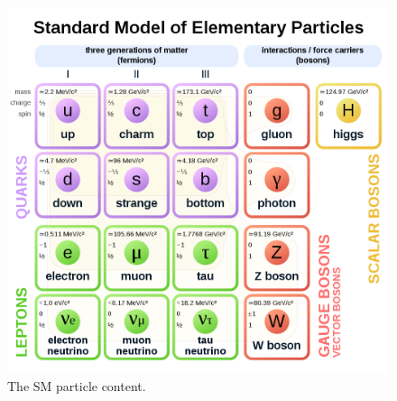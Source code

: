 \begin{figure}[hbtp]
\centering
\includegraphics[scale=0.3]{figures/intro/sm_particles.png}
\caption{The SM particle content.}
\label{sm_particles}
\end{figure}
